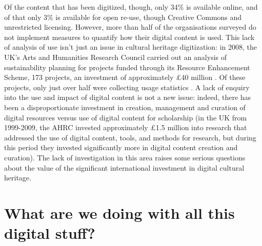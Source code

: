 \documentclass[amsthm,ebook]{saparticle}
\begin{document}
Of the content that has been digitized, though, only 34\% is available online, and of that only 3\% is available for open re-use, though Creative Commons and unrestricted licensing. However, more than half of the organisations surveyed do not implement measures to quantify how their digital content is used. This lack of analysis of use isn’t just an issue in cultural heritage digitization: in 2008, the UK’s Arts and Humanities Research Council carried out an analysis of sustainability planning for projects funded through its Resource Enhancement Scheme, 173 projects, an investment of approximately £40 million \citep{Robey:2008aa}. Of these projects, only just over half were collecting usage statistics \citep[153]{Robey:2011aa}. A lack of enquiry into the use and impact of digital content is not a new issue: indeed, there has been a disproportionate investment in creation, management and curation of digital resources versus use of digital content for scholarship (in the UK from 1999-2009, the AHRC invested approximately £1.5 million into research that addressed the use of digital content, tools, and methods for research, but during this period they invested significantly more in digital content creation and curation). The lack of investigation in this area raises some serious questions about the value of the significant international investment in digital cultural heritage.
 
\section{What are we doing with all this digital stuff?}
\end{document}
